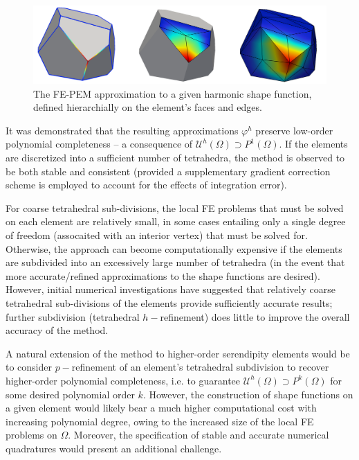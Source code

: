 \begin{figure} [!ht]
	\centering
	\includegraphics[width = 6.0in]{figures/harmonic_fem_sfs.pdf}
	\caption{The FE-PEM approximation to a given harmonic shape function, defined hierarchially on the element's faces and edges.}
	\label{fig:harmonic_fem_sfs}
\end{figure}
	
	It was demonstrated that the resulting approximations $\varphi^h$ preserve low-order polynomial completeness -- a consequence of $\mathcal{U}^h (\Omega) \supset P^1 (\Omega)$. If the elements are discretized into a sufficient number of tetrahedra, the method is observed to be both stable and consistent (provided a supplementary gradient correction scheme is employed to account for the effects of integration error).
	
	For coarse tetrahedral sub-divisions, the local FE problems that must be solved on each element are relatively small, in some cases entailing only a single degree of freedom (assocaited with an interior vertex) that must be solved for. Otherwise, the approach can become computationally expensive if the elements are subdivided into an excessively large number of tetrahedra (in the event that more accurate/refined approximations to the shape functions are desired). However, initial numerical investigations have suggested that relatively coarse tetrahedral sub-divisions of the elements provide sufficiently accurate results; further subdivision (tetrahedral $h-$refinement) does little to improve the overall accuracy of the method.
	
	A natural extension of the method to higher-order serendipity elements would be to consider $p-$refinement of an element's tetrahedral subdivision to recover higher-order polynomial completeness, i.e. to guarantee $\mathcal{U}^h (\Omega) \supset P^k (\Omega)$ for some desired polynomial order $k$. However, the construction of shape functions on a given element would likely bear a much higher computational cost with increasing polynomial degree, owing to the increased size of the local FE problems on $\Omega$. Moreover, the specification of stable and accurate numerical quadratures would present an additional challenge.
	
